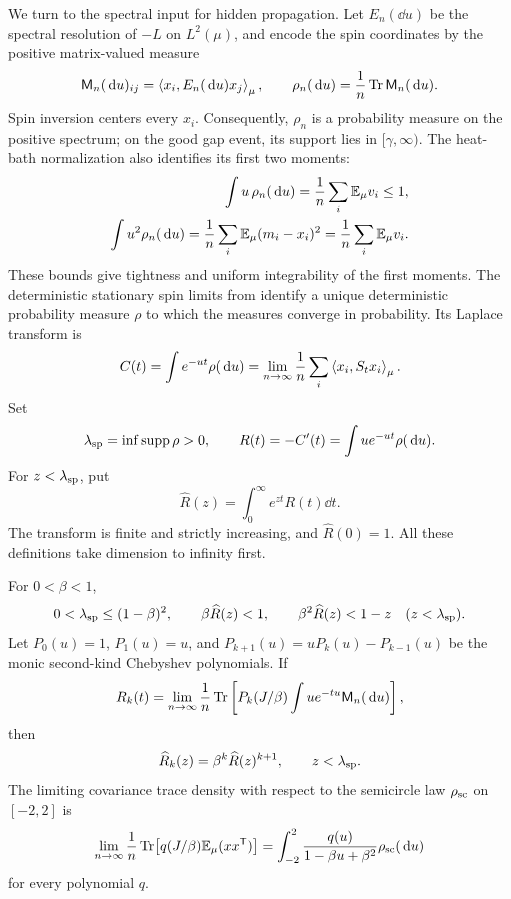 We turn to the spectral input for hidden propagation.  Let $E_n(\dd u)$
be the spectral resolution of $-L$ on $L^2(\mu)$, and encode the spin
coordinates by the positive matrix-valued measure
\[
 \mathsf M_n(\,\mathrm d u)_{ij}
      =\left\langle x_i,E_n(\,\mathrm d u)x_j\right\rangle_\mu,
 \qquad \rho_n(\,\mathrm d u)=\frac1n\operatorname{Tr}\mathsf M_n(\,\mathrm d u).
\]
Spin inversion centers every $x_i$.  Consequently, $\rho_n$ is a
probability measure on the positive spectrum; on the good gap event,
its support lies in $[\gamma,\infty)$.  The heat-bath normalization
also identifies its first two moments:
\begin{equation}
 \begin{aligned}
 \int u\,\rho_n(\,\mathrm d u)=\frac1n\sum_i\mathbb E_\mu v_i\le1,
 \\
 \int u^2\rho_n(\,\mathrm d u)=\frac1n\sum_i\mathbb E_\mu(m_i-x_i)^2
                     =\frac1n\sum_i\mathbb E_\mu v_i.
 \end{aligned}
 \label{eq:spin-first-second}
\end{equation}
These bounds give tightness and uniform integrability of the first
moments.  The deterministic stationary spin limits from
 identify a unique deterministic probability
measure $\rho$ to which the measures converge in probability.  Its
Laplace transform is
\begin{equation}
 C(t)=\int e^{-ut}\rho(\,\mathrm d u)
     =\lim_{n\to\infty}\frac1n\sum_i\left\langle x_i,S_tx_i\right\rangle_\mu.
 \label{eq:spin-correlation}
\end{equation}
Set
\[
 \lambda_{\rm sp}=\inf\operatorname{supp}\rho>0,
 \qquad R(t)=-C'(t)=\int u e^{-ut}\rho(\,\mathrm d u).
\]
For \(z<\lambda_{\rm sp}\), put
\[
 \widehat R(z)=\int_0^\infty e^{zt}R(t)\dd t.
\]
The transform is finite and strictly increasing, and
$\widehat R(0)=1$.  All these definitions take dimension to infinity
first.

\begin{proposition}
\label{prop:spin-spectrum}
For $0<\beta<1$,
\begin{equation}
 0<\lambda_{\rm sp}\le(1-\beta)^2,
 \qquad \beta\widehat R(z)<1,
 \qquad \beta^2\widehat R(z)<1-z
 \quad(z<\lambda_{\rm sp}).
 \label{eq:spin-conditions}
\end{equation}
Let $P_0(u)=1$, $P_1(u)=u$, and
$P_{k+1}(u)=uP_k(u)-P_{k-1}(u)$ be the monic second-kind Chebyshev
polynomials.  If
\[
 R_k(t)=\lim_{n\to\infty}\frac1n\operatorname{Tr}\left[
 P_k(J/\beta)\int u e^{-tu}\mathsf M_n(\,\mathrm d u)\right],
\]
then
\begin{equation}
 \widehat R_k(z)=\beta^k\widehat R(z)^{k+1},
 \qquad z<\lambda_{\rm sp}.
 \label{eq:spin-trunk-transform}
\end{equation}
The limiting covariance trace density with respect to the semicircle
law $\rho_{\rm sc}$ on $[-2,2]$ is
\begin{equation}
 \lim_{n\to\infty}\frac1n
     \operatorname{Tr}\bigl[q(J/\beta)\mathbb E_\mu(xx^{\mathsf T})\bigr]
  =\int_{-2}^2\frac{q(u)}{1-\beta u+\beta^2}\rho_{\rm sc}(\,\mathrm d u)
 \label{eq:spin-covariance-density}
\end{equation}
for every polynomial $q$.
\end{proposition}

